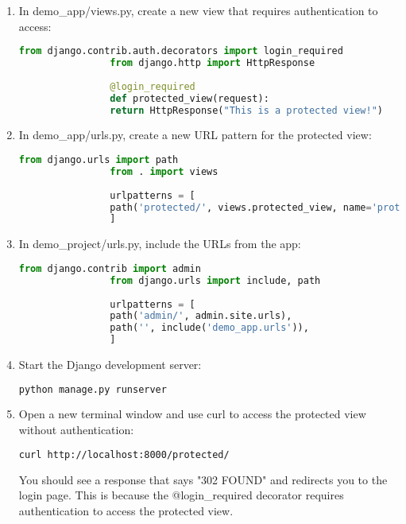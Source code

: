 {\begin{enumerate}
			\item In demo\_app/views.py, create a new view that requires authentication to access:
			
			\begin{lstlisting}[language=Python]
				from django.contrib.auth.decorators import login_required
				from django.http import HttpResponse
				
				@login_required
				def protected_view(request):
				return HttpResponse("This is a protected view!")
			\end{lstlisting}
			
			\item In demo\_app/urls.py, create a new URL pattern for the protected view:
			
			\begin{lstlisting}[language=Python]
				from django.urls import path
				from . import views
				
				urlpatterns = [
				path('protected/', views.protected_view, name='protected'),
				]
			\end{lstlisting}
			
			\item In demo\_project/urls.py, include the URLs from the app:
			
			\begin{lstlisting}[language=Python]
				from django.contrib import admin
				from django.urls import include, path
				
				urlpatterns = [
				path('admin/', admin.site.urls),
				path('', include('demo_app.urls')),
				]
			\end{lstlisting}
			
			\item Start the Django development server:
			
			\begin{lstlisting}[language=bash]
				python manage.py runserver
			\end{lstlisting}
			
			\item Open a new terminal window and use curl to access the protected view without authentication:
			
			\begin{lstlisting}[language=bash]
				curl http://localhost:8000/protected/
			\end{lstlisting}
			
			You should see a response that says "302 FOUND" and redirects you to the login page. This is because the @login\_required decorator requires authentication to access the protected view.
			

\end{enumerate}}
